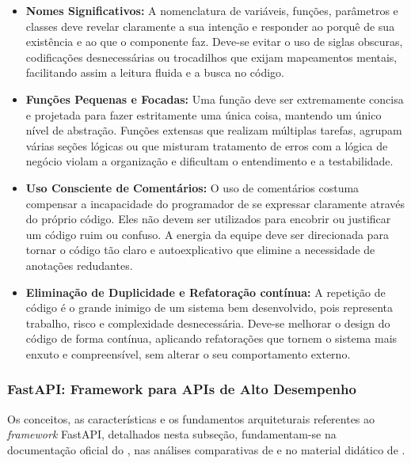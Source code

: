 \begin{itemize}
    \item \textbf{Nomes Significativos:} A nomenclatura de variáveis, funções, parâmetros e classes deve revelar claramente a sua intenção e responder ao porquê de sua existência e ao que o componente faz. Deve-se evitar o uso de siglas obscuras, codificações desnecessárias ou trocadilhos que exijam mapeamentos mentais, facilitando assim a leitura fluida e a busca no código. %

    \item \textbf{Funções Pequenas e Focadas:} Uma função deve ser extremamente concisa e projetada para fazer estritamente uma única coisa, mantendo um único nível de abstração. Funções extensas que realizam múltiplas tarefas, agrupam várias seções lógicas ou que misturam tratamento de erros com a lógica de negócio violam a organização e dificultam o entendimento e a testabilidade. %

    \item \textbf{Uso Consciente de Comentários:} O uso de comentários costuma compensar a incapacidade do programador de se expressar claramente através do próprio código. Eles não devem ser utilizados para encobrir ou justificar um código ruim ou confuso. A energia da equipe deve ser direcionada para tornar o código tão claro e autoexplicativo que elimine a necessidade de anotações redudantes. %

    \item \textbf{Eliminação de Duplicidade e Refatoração contínua:} A repetição de código é o grande inimigo de um sistema bem desenvolvido, pois representa trabalho, risco e complexidade desnecessária. Deve-se melhorar o design do código de forma contínua, aplicando refatorações que tornem o sistema mais enxuto e compreensível, sem alterar o seu comportamento externo. %
\end{itemize}

\subsubsection{FastAPI: Framework para APIs de Alto Desempenho}

Os conceitos, as características e os fundamentos arquiteturais referentes ao \textit{framework} FastAPI, detalhados nesta subseção, fundamentam-se na documentação oficial do , nas análises comparativas de  e no material didático de .

